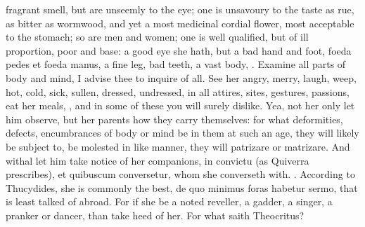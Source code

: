 {fragrant smell, but are unseemly to the eye; one is unsavoury to the
taste as rue, as bitter as wormwood, and yet a most medicinal cordial
flower, most acceptable to the stomach; so are men and women; one is
well qualified, but of ill proportion, poor and base: a good eye she
hath, but a bad hand and foot, foeda pedes et foeda manus, a fine leg,
bad teeth, a vast body, \etc{}. Examine all parts of body and mind, I
advise thee to inquire of all. See her angry, merry, laugh, weep, hot,
cold, sick, sullen, dressed, undressed, in all attires, sites,
gestures, passions, eat her meals, \etc{}, and in some of these you will
surely dislike. Yea, not her only let him observe, but her parents how
they carry themselves: for what deformities, defects, encumbrances of
body or mind be in them at such an age, they will likely be subject to,
be molested in like manner, they will patrizare or matrizare. And
withal let him take notice of her companions, in convictu (as Quiverra
prescribes), et quibuscum conversetur, whom she converseth with.
. According to
Thucydides, she is commonly the best, de quo minimus foras habetur
sermo, that is least talked of abroad. For if she be a noted reveller,
a gadder, a singer, a pranker or dancer, than take heed of her. For
what saith Theocritus?

}
